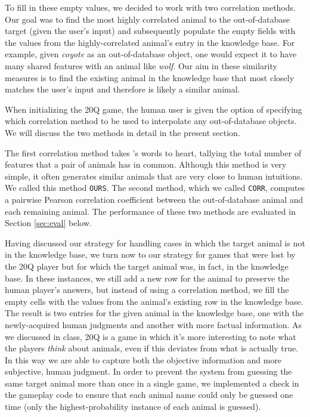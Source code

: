 \documentclass[11pt,a4paper]{article}
\begin{document}
{To fill in these empty values, we decided to work with two correlation methods. 
Our goal was to find the most highly correlated animal to the out-of-database target (given the user's input) and subsequently populate the empty fields with the values from the highly-correlated animal's entry in the knowledge base. 
For example, given \textit{coyote} as an out-of-database object, one would expect it to have many shared features with an animal like \textit{wolf}. 
Our aim in these similarity measures is to find the existing animal in the knowledge base that most closely matches the user's input and therefore is likely a similar animal.

When initializing the 20Q game, the human user is given the option of specifying which correlation method to be used to interpolate any out-of-database objects. We will discuss the two methods in detail in the present section.

The first correlation method takes \citeauthor{Rosch1978}'s \citeyearpar{Rosch1978} words to heart, tallying the total number of features that a pair of animals has in common. Although this method is very simple, it often generates similar animals that are very close to human intuitions. We called this method \texttt{OURS}. 
The second method, which we called \texttt{CORR}, computes a pairwise Pearson correlation coefficient between the out-of-database animal and each remaining animal. 
The performance of these two methods are evaluated in Section \ref{sec:eval} below.

Having discussed our strategy for handling cases in which the target animal is not in the knowledge base, we turn now to our strategy for games that were lost by the 20Q player but for which the target animal was, in fact, in the knowledge base. 
In these instances, we still add a new row for the animal to preserve the human player's answers, but instead of using a correlation method, we fill the empty cells with the values from the animal's existing row in the knowledge base. 
The result is two entries for the given animal in the knowledge base, one with the newly-acquired human judgments and another with more factual information. 
As we discussed in class, 20Q is a game in which it's more interesting to note what the players \textit{think} about animals, even if this deviates from what is actually true. 
In this way we are able to capture both the objective information and more subjective, human judgment. 
In order to prevent the system from guessing the same target animal more than once in a single game, we implemented a check in the gameplay code to ensure that each animal name could only be guessed one time (only the highest-probability instance of each animal is guessed).  

}
\end{document}
